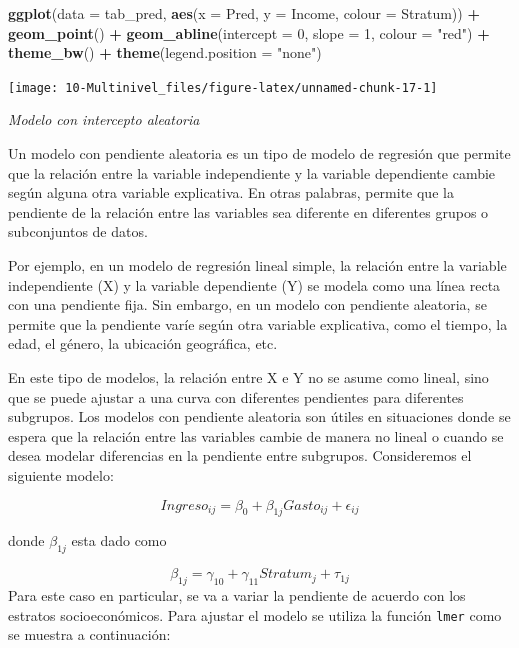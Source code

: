 \documentclass[
  12pt,
]{book}
\newenvironment{Shaded}{\begin{snugshade}}{\end{snugshade}}
\newcommand{\AttributeTok}[1]{\textcolor[rgb]{0.13,0.29,0.53}{#1}}
\newcommand{\DecValTok}[1]{\textcolor[rgb]{0.00,0.00,0.81}{#1}}
\newcommand{\FunctionTok}[1]{\textcolor[rgb]{0.13,0.29,0.53}{\textbf{#1}}}
\newcommand{\NormalTok}[1]{#1}
\newcommand{\SpecialCharTok}[1]{\textcolor[rgb]{0.81,0.36,0.00}{\textbf{#1}}}
\newcommand{\StringTok}[1]{\textcolor[rgb]{0.31,0.60,0.02}{#1}}
\begin{document}
\begin{Shaded}
\begin{Highlighting}[]
\FunctionTok{ggplot}\NormalTok{(}\AttributeTok{data =}\NormalTok{ tab\_pred, }\FunctionTok{aes}\NormalTok{(}\AttributeTok{x =}\NormalTok{ Pred, }\AttributeTok{y =}\NormalTok{ Income, }\AttributeTok{colour =}\NormalTok{ Stratum)) }\SpecialCharTok{+} 
  \FunctionTok{geom\_point}\NormalTok{() }\SpecialCharTok{+} \FunctionTok{geom\_abline}\NormalTok{(}\AttributeTok{intercept =} \DecValTok{0}\NormalTok{, }\AttributeTok{slope =} \DecValTok{1}\NormalTok{, }\AttributeTok{colour =} \StringTok{"red"}\NormalTok{) }\SpecialCharTok{+}
  \FunctionTok{theme\_bw}\NormalTok{() }\SpecialCharTok{+} \FunctionTok{theme}\NormalTok{(}\AttributeTok{legend.position =} \StringTok{"none"}\NormalTok{) }
\end{Highlighting}
\end{Shaded}

\texttt{[image: 10-Multinivel\_files/figure-latex/unnamed-chunk-17-1]}

\emph{Modelo con intercepto aleatoria}

Un modelo con pendiente aleatoria es un tipo de modelo de regresión que permite que la relación entre la variable independiente y la variable dependiente cambie según alguna otra variable explicativa. En otras palabras, permite que la pendiente de la relación entre las variables sea diferente en diferentes grupos o subconjuntos de datos.

Por ejemplo, en un modelo de regresión lineal simple, la relación entre la variable independiente (X) y la variable dependiente (Y) se modela como una línea recta con una pendiente fija. Sin embargo, en un modelo con pendiente aleatoria, se permite que la pendiente varíe según otra variable explicativa, como el tiempo, la edad, el género, la ubicación geográfica, etc.

En este tipo de modelos, la relación entre X e Y no se asume como lineal, sino que se puede ajustar a una curva con diferentes pendientes para diferentes subgrupos. Los modelos con pendiente aleatoria son útiles en situaciones donde se espera que la relación entre las variables cambie de manera no lineal o cuando se desea modelar diferencias en la pendiente entre subgrupos. Consideremos el siguiente modelo:

\[
Ingreso_{ij}=\beta_{0}+\beta_{1j}Gasto_{ij}+\epsilon_{ij}
\]

donde \(\beta_{1j}\) esta dado como

\[
\beta_{1j} = \gamma_{10}+\gamma_{11}Stratum_{j} + \tau_{1j}
\]
Para este caso en particular, se va a variar la pendiente de acuerdo con los estratos socioeconómicos. Para ajustar el modelo se utiliza la función \texttt{lmer} como se muestra a continuación:
\end{document}
